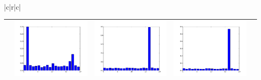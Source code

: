 \documentclass[twoside,11pt]{article}
\begin{document}
\begin{table}[t]
\begin{center}
{\begin{tabular}{|c|r|c|}
\begin{tabular}{ccccc}
&
\includegraphics[width=\barw\textwidth]{visualize_dist_paMedLDAgibbs_6/6_1} &
\includegraphics[width=\barw\textwidth]{visualize_dist_paMedLDAgibbs_6/6_8} &
\includegraphics[width=\barw\textwidth]{visualize_dist_paMedLDAgibbs_6/6_22} \\
\hline
\end{tabular} \\


\end{tabular}}
\end{center}
\end{table}
\end{document}
